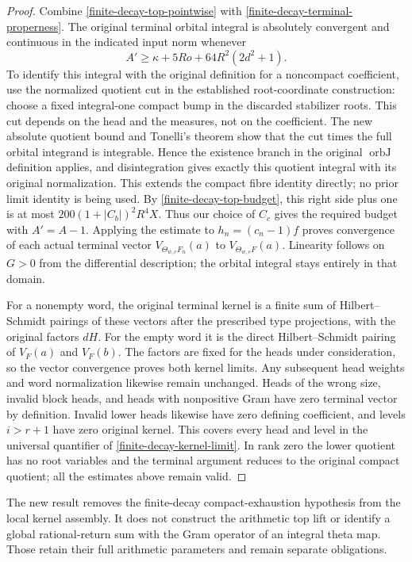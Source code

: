 \begin{proof}
Combine \eqref{finite-decay-top-pointwise} with
\eqref{finite-decay-terminal-properness}.  The original terminal
orbital integral is absolutely convergent and continuous in the
indicated input norm whenever
\[
 A'\ge\kappa+5Ro+64R^2(2d^2+1).
\]
To identify this integral with the original definition for a
noncompact coefficient, use the normalized quotient cut in the
established root-coordinate construction: choose a fixed
integral-one compact bump in the discarded stabilizer roots.
This cut depends on the head and the measures, not on the
coefficient.  The new absolute quotient bound and Tonelli's
theorem show that the cut times the full orbital integrand is
integrable.  Hence the existence branch in the original
$\operatorname{orbJ}$ definition applies, and disintegration gives
exactly this quotient integral with its original normalization.
This extends the compact fibre identity directly; no prior limit
identity is being used.
By \eqref{finite-decay-top-budget}, this right side plus one is
at most $200(1+|C_b|)^2R^4X$.  Thus our choice of $C_c$ gives
the required budget with $A'=A-1$.  Applying the estimate to
$h_n=(c_n-1)f$ proves convergence of each actual terminal vector
$V_{\Theta_{w,e}F_n}(a)$ to $V_{\Theta_{w,e}F}(a)$.
Linearity follows on $G>0$ from the differential description;
the orbital integral stays entirely in that domain.

For a nonempty word, the original terminal kernel is a finite sum
of Hilbert--Schmidt pairings of these vectors after the prescribed
type projections, with the original factors $dH$.  For the empty
word it is the direct Hilbert--Schmidt pairing of $V_F(a)$ and
$V_F(b)$.  The factors are fixed for the heads under consideration,
so the vector convergence proves both kernel limits.  Any subsequent
head weights and word normalization likewise remain unchanged.
Heads of the
wrong size, invalid block heads, and heads with nonpositive Gram
have zero terminal vector by definition.  Invalid lower heads
likewise have zero defining coefficient, and levels $i>r+1$ have
zero original kernel.  This covers every head and level
in the universal quantifier of \eqref{finite-decay-kernel-limit}.
In rank zero the lower quotient has no root variables and the
terminal argument reduces to the original compact quotient; all
the estimates above remain valid.
\end{proof}

The new result removes the finite-decay compact-exhaustion hypothesis
from the local kernel assembly.  It does not construct the arithmetic
top lift or identify a global rational-return sum with the Gram
operator of an integral theta map.  Those retain their full arithmetic
parameters and remain separate obligations.
